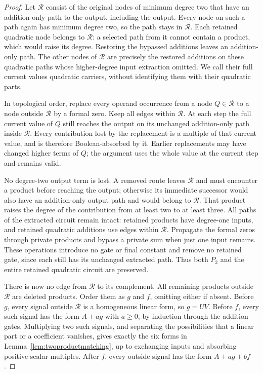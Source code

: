 \documentclass[11pt]{article}
\theoremstyle{definition}
\theoremstyle{remark}
\begin{document}
\begin{proof}
Let $\mathcal R$ consist of the original nodes of minimum degree two that have an addition-only path to the output, including the output. Every node on such a path again has minimum degree two, so the path stays in $\mathcal R$. Each retained quadratic node belongs to $\mathcal R$: a selected path from it cannot contain a product, which would raise its degree. Restoring the bypassed additions leaves an addition-only path. The other nodes of $\mathcal R$ are precisely the restored additions on these quadratic paths whose higher-degree input extraction omitted. We call their full current values quadratic carriers, without identifying them with their quadratic parts.

In topological order, replace every operand occurrence from a node $Q\in\mathcal R$ to a node outside $\mathcal R$ by a formal zero. Keep all edges within $\mathcal R$. At each step the full current value of $Q$ still reaches the output on its unchanged addition-only path inside $\mathcal R$. Every contribution lost by the replacement is a multiple of that current value, and is therefore Boolean-absorbed by it. Earlier replacements may have changed higher terms of $Q$; the argument uses the whole value at the current step and remains valid.

No degree-two output term is lost. A removed route leaves $\mathcal R$ and must encounter a product before reaching the output; otherwise its immediate successor would also have an addition-only output path and would belong to $\mathcal R$. That product raises the degree of the contribution from at least two to at least three. All paths of the extracted circuit remain intact: retained products have degree-one inputs, and retained quadratic additions use edges within $\mathcal R$. Propagate the formal zeros through private products and bypass a private sum when just one input remains. These operations introduce no gate or final constant and remove no retained gate, since each still has its unchanged extracted path. Thus both $P_2$ and the entire retained quadratic circuit are preserved.

There is now no edge from $\mathcal R$ to its complement. All remaining products outside $\mathcal R$ are deleted products. Order them as $g$ and $f$, omitting either if absent. Before $g$, every signal outside $\mathcal R$ is a homogeneous linear form, so $g=UV$. Before $f$, every such signal has the form $A+ag$ with $a\ge0$, by induction through the addition gates. Multiplying two such signals, and separating the possibilities that a linear part or a coefficient vanishes, gives exactly the six forms in Lemma~\ref{lem:twoproductmatching}, up to exchanging inputs and absorbing positive scalar multiples. After $f$, every outside signal has the form $A+ag+bf$.


\end{proof}
\end{document}
